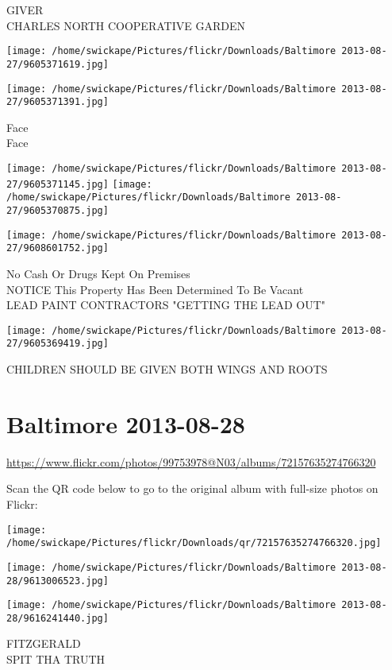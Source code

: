 \documentclass[10pt,letterpaper]{article}
\begin{document}
GIVER\\
CHARLES NORTH COOPERATIVE GARDEN
\pagebreak

\texttt{[image: /home/swickape/Pictures/flickr/Downloads/Baltimore 2013-08-27/9605371619.jpg]}

\vspace{0.25in}
\texttt{[image: /home/swickape/Pictures/flickr/Downloads/Baltimore 2013-08-27/9605371391.jpg]}

Face\\
Face
\pagebreak

\texttt{[image: /home/swickape/Pictures/flickr/Downloads/Baltimore 2013-08-27/9605371145.jpg]}
\texttt{[image: /home/swickape/Pictures/flickr/Downloads/Baltimore 2013-08-27/9605370875.jpg]}

\vspace{0.25in}
\texttt{[image: /home/swickape/Pictures/flickr/Downloads/Baltimore 2013-08-27/9608601752.jpg]}

No Cash Or Drugs Kept On Premises\\
NOTICE This Property Has Been Determined To Be Vacant\\
LEAD PAINT CONTRACTORS "GETTING THE LEAD OUT"
\pagebreak

\texttt{[image: /home/swickape/Pictures/flickr/Downloads/Baltimore 2013-08-27/9605369419.jpg]}

CHILDREN SHOULD BE GIVEN BOTH WINGS AND ROOTS
\pagebreak

\section*{Baltimore 2013-08-28}

\url{https://www.flickr.com/photos/99753978@N03/albums/72157635274766320}

Scan the QR code below to go to the original album with full-size photos on Flickr:

\texttt{[image: /home/swickape/Pictures/flickr/Downloads/qr/72157635274766320.jpg]}
\pagebreak

\texttt{[image: /home/swickape/Pictures/flickr/Downloads/Baltimore 2013-08-28/9613006523.jpg]}

\vspace{0.25in}
\texttt{[image: /home/swickape/Pictures/flickr/Downloads/Baltimore 2013-08-28/9616241440.jpg]}

FITZGERALD\\
SPIT THA TRUTH
\pagebreak
\end{document}
